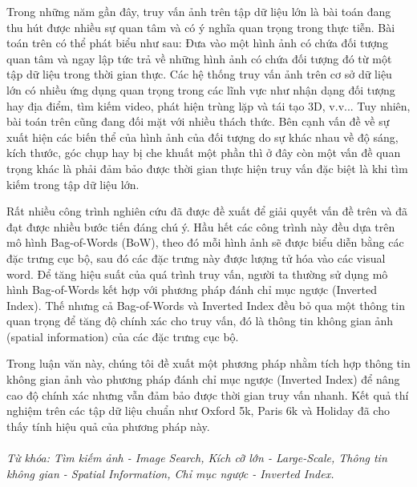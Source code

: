 \begin{abstracts}         
Trong những năm gần đây, truy vấn ảnh trên tập dữ liệu lớn là bài toán đang thu hút được nhiều sự quan tâm và có ý nghĩa quan trọng trong thực tiễn. Bài toán trên có thể phát biểu như sau: Đưa vào một hình ảnh có chứa đối tượng quan tâm và ngay lập tức trả về những hình ảnh có chứa đối tượng đó từ một tập dữ liệu trong thời gian thực. Các hệ thống truy vấn ảnh trên cơ sở dữ liệu lớn có nhiều ứng dụng quan trọng trong các lĩnh vực như nhận dạng đối tượng hay địa điểm, tìm kiếm video, phát hiện trùng lặp và tái tạo 3D, v.v... Tuy nhiên, bài toán trên cũng đang đối mặt với nhiều thách thức. Bên cạnh vấn đề về sự xuất hiện các biến thể của hình ảnh của đối tượng do sự khác nhau về độ sáng, kích thước, góc chụp hay bị che khuất một phần thì ở đây còn một vấn đề quan trọng khác là phải đảm bảo được thời gian thực hiện truy vấn đặc biệt là khi tìm kiếm trong tập dữ liệu lớn.

Rất nhiều công trình nghiên cứu đã được đề xuất để giải quyết vấn đề trên và đã đạt được nhiều bước tiến đáng chú ý. Hầu hết các công trình này đều dựa trên mô hình Bag-of-Words (BoW), theo đó mỗi hình ảnh sẽ được biểu diễn bằng các đặc trưng cục bộ, sau đó các đặc trưng này được lượng tử hóa vào các visual word. Để tăng hiệu suất của quá trình truy vấn, người ta thường sử dụng mô hình Bag-of-Words kết hợp với phương pháp đánh chỉ mục ngược (Inverted Index). Thế nhưng cả Bag-of-Words và Inverted Index đều bỏ qua một thông tin quan trọng để tăng độ chính xác cho truy vấn, đó là thông tin không gian ảnh (spatial information) của các đặc trưng cục bộ. 

Trong luận văn này, chúng tôi đề xuất một phương pháp nhằm tích hợp thông tin không gian ảnh vào phương pháp đánh chỉ mục ngược (Inverted Index) để nâng cao độ chính xác nhưng vẫn đảm bảo được thời gian truy vấn nhanh. Kết quả thí nghiệm trên các tập dữ liệu chuẩn như Oxford 5k, Paris 6k và Holiday đã cho thấy tính hiệu quả của phương pháp này.\\
\\
\textit{Từ khóa: Tìm kiếm ảnh - Image Search, Kích cỡ lớn - Large-Scale, Thông tin không gian - Spatial Information, Chỉ mục ngược - Inverted Index.}

\end{abstracts}
 